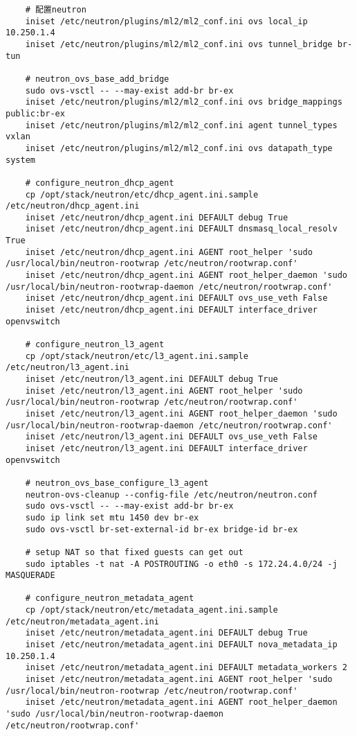 \documentclass[a4paper,left=1.5cm,right=1.5cm,11pt]{article}
\begin{document}
\begin{lstlisting}
	# 配置neutron
	iniset /etc/neutron/plugins/ml2/ml2_conf.ini ovs local_ip 10.250.1.4
	iniset /etc/neutron/plugins/ml2/ml2_conf.ini ovs tunnel_bridge br-tun

	# neutron_ovs_base_add_bridge
	sudo ovs-vsctl -- --may-exist add-br br-ex
	iniset /etc/neutron/plugins/ml2/ml2_conf.ini ovs bridge_mappings public:br-ex
	iniset /etc/neutron/plugins/ml2/ml2_conf.ini agent tunnel_types vxlan
	iniset /etc/neutron/plugins/ml2/ml2_conf.ini ovs datapath_type system

	# configure_neutron_dhcp_agent
	cp /opt/stack/neutron/etc/dhcp_agent.ini.sample /etc/neutron/dhcp_agent.ini
	iniset /etc/neutron/dhcp_agent.ini DEFAULT debug True
	iniset /etc/neutron/dhcp_agent.ini DEFAULT dnsmasq_local_resolv True
	iniset /etc/neutron/dhcp_agent.ini AGENT root_helper 'sudo /usr/local/bin/neutron-rootwrap /etc/neutron/rootwrap.conf'
	iniset /etc/neutron/dhcp_agent.ini AGENT root_helper_daemon 'sudo /usr/local/bin/neutron-rootwrap-daemon /etc/neutron/rootwrap.conf'
	iniset /etc/neutron/dhcp_agent.ini DEFAULT ovs_use_veth False
	iniset /etc/neutron/dhcp_agent.ini DEFAULT interface_driver openvswitch

	# configure_neutron_l3_agent
	cp /opt/stack/neutron/etc/l3_agent.ini.sample /etc/neutron/l3_agent.ini
	iniset /etc/neutron/l3_agent.ini DEFAULT debug True
	iniset /etc/neutron/l3_agent.ini AGENT root_helper 'sudo /usr/local/bin/neutron-rootwrap /etc/neutron/rootwrap.conf'
	iniset /etc/neutron/l3_agent.ini AGENT root_helper_daemon 'sudo /usr/local/bin/neutron-rootwrap-daemon /etc/neutron/rootwrap.conf'
	iniset /etc/neutron/l3_agent.ini DEFAULT ovs_use_veth False
	iniset /etc/neutron/l3_agent.ini DEFAULT interface_driver openvswitch
	
	# neutron_ovs_base_configure_l3_agent
	neutron-ovs-cleanup --config-file /etc/neutron/neutron.conf
	sudo ovs-vsctl -- --may-exist add-br br-ex
	sudo ip link set mtu 1450 dev br-ex
	sudo ovs-vsctl br-set-external-id br-ex bridge-id br-ex

	# setup NAT so that fixed guests can get out
	sudo iptables -t nat -A POSTROUTING -o eth0 -s 172.24.4.0/24 -j MASQUERADE

	# configure_neutron_metadata_agent
	cp /opt/stack/neutron/etc/metadata_agent.ini.sample /etc/neutron/metadata_agent.ini
	iniset /etc/neutron/metadata_agent.ini DEFAULT debug True
	iniset /etc/neutron/metadata_agent.ini DEFAULT nova_metadata_ip 10.250.1.4
	iniset /etc/neutron/metadata_agent.ini DEFAULT metadata_workers 2
	iniset /etc/neutron/metadata_agent.ini AGENT root_helper 'sudo /usr/local/bin/neutron-rootwrap /etc/neutron/rootwrap.conf'
	iniset /etc/neutron/metadata_agent.ini AGENT root_helper_daemon 'sudo /usr/local/bin/neutron-rootwrap-daemon /etc/neutron/rootwrap.conf'


\end{lstlisting}
\end{document}
